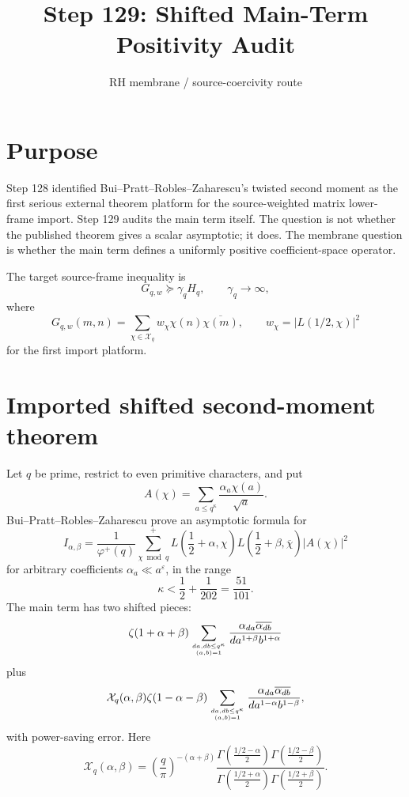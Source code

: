 \documentclass[11pt]{article}
\title{Step 129: Shifted Main-Term Positivity Audit}
\author{RH membrane / source-coercivity route}
\date{}
\begin{document}
\maketitle

\section{Purpose}
Step 128 identified Bui--Pratt--Robles--Zaharescu's twisted second moment as the first serious external theorem platform for the source-weighted matrix lower-frame import.  Step 129 audits the main term itself.  The question is not whether the published theorem gives a scalar asymptotic; it does.  The membrane question is whether the main term defines a uniformly positive coefficient-space operator.

The target source-frame inequality is
\[
G_{q,w}\succeq \gamma_q H_q,
\qquad \gamma_q\to\infty,
\]
where
\[
G_{q,w}(m,n)=\sum_{\chi\in\mathcal X_q} w_\chi\chi(n)\overline{\chi(m)},
\qquad w_\chi=|L(1/2,\chi)|^2
\]
for the first import platform.

\section{Imported shifted second-moment theorem}
Let $q$ be prime, restrict to even primitive characters, and put
\[
A(\chi)=\sum_{a\le q^\kappa}\frac{\alpha_a\chi(a)}{\sqrt a}.
\]
Bui--Pratt--Robles--Zaharescu prove an asymptotic formula for
\[
I_{\alpha,\beta}
=\frac{1}{\varphi^+(q)}\sum_{\chi\bmod q}^{+}
L\left(\frac12+\alpha,\chi\right)
L\left(\frac12+\beta,\overline\chi\right)|A(\chi)|^2
\]
for arbitrary coefficients $\alpha_a\ll a^\varepsilon$, in the range
\[
\kappa<\frac12+\frac1{202}=\frac{51}{101}.
\]
The main term has two shifted pieces:
\[
\zeta(1+\alpha+\beta)
\sum_{da,db\le q^\kappa\atop (a,b)=1}
\frac{\alpha_{da}\overline{\alpha_{db}}}{d a^{1+\beta}b^{1+\alpha}}
\]
plus
\[
\mathcal X_q(\alpha,\beta)
\zeta(1-\alpha-\beta)
\sum_{da,db\le q^\kappa\atop (a,b)=1}
\frac{\alpha_{da}\overline{\alpha_{db}}}{d a^{1-\alpha}b^{1-\beta}},
\]
with power-saving error.  Here
\[
\mathcal X_q(\alpha,\beta)=
\left(\frac q\pi\right)^{-(\alpha+\beta)}
\frac{\Gamma\left(\frac{1/2-\alpha}{2}\right)\Gamma\left(\frac{1/2-\beta}{2}\right)}
{\Gamma\left(\frac{1/2+\alpha}{2}\right)\Gamma\left(\frac{1/2+\beta}{2}\right)}.
\]
\end{document}
